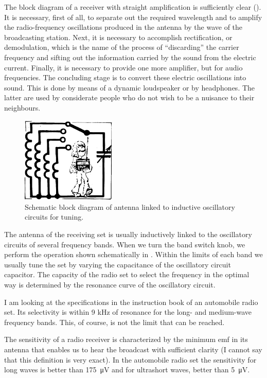 The block diagram of a receiver with straight amplification is sufficiently clear (). It is necessary, first of all, to separate out the required wavelength and to amplify the radio-frequency oscillations produced in the antenna by the wave of the broadcasting station. Next, it is necessary to accomplish rectification, or demodulation, which is the name of the process of ``discarding'' the carrier frequency and sifting out the information carried by the sound from the electric current. Finally, it is necessary to provide one more amplifier, but for audio frequencies. The concluding stage is to convert these electric oscillations into sound. This is done by means of a dynamic loudspeaker or by headphones. The latter are used by considerate people who do not wish to be a nuisance to their neighbours.


\begin{figure}[!ht]
\centering
\includegraphics[width=0.4\textwidth]{figures/fig-06-11.pdf}
\caption{Schematic block diagram of antenna linked to inductive oscillatory circuits for tuning.}
\label{fig-6.11}
\end{figure}


The antenna of the receiving set is usually inductively linked to the oscillatory circuits of several frequency bands. When we turn the band switch knob, we perform the operation shown schematically in . Within the limits of each band we usually tune the set by varying the capacitance of the oscillatory circuit capacitor. The capacity of the radio set to select the frequency in the optimal way is determined by the resonance curve of the oscillatory circuit.

I am looking at the specifications in the instruction book of an automobile radio set. Its selectivity is within 9 kHz of resonance for the long- and medium-wave frequency bands. This, of course, is not the limit that can be reached.

The sensitivity of a radio receiver is characterized by the minimum emf in its antenna that enables us to hear the broadcast with sufficient clarity (I cannot say that this definition is very exact). In the automobile radio set the sensitivity for long waves is better than \SI{175}{\micro\volt} and for ultrashort waves, better than \SI{5}{\micro\volt}.

